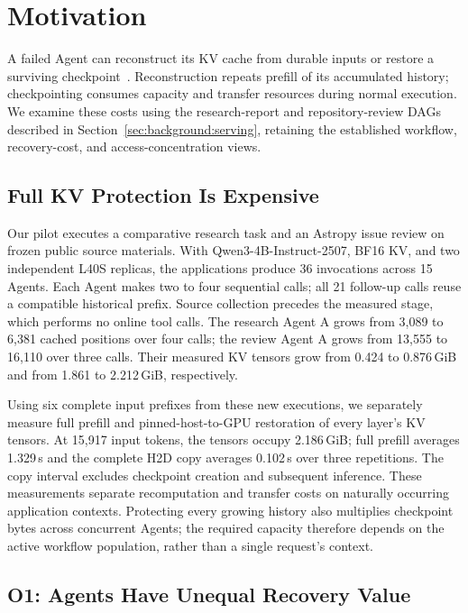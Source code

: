 \section{Motivation}\label{sec:motivation}

A failed Agent can reconstruct its KV cache from durable inputs or restore a surviving checkpoint~\cite{strati2024dejavu,cao2026lumen}. Reconstruction repeats prefill of its accumulated history; checkpointing consumes capacity and transfer resources during normal execution. We examine these costs using the research-report and repository-review DAGs described in Section~\ref{sec:background:serving}, retaining the established workflow, recovery-cost, and access-concentration views.

\subsection{Full KV Protection Is Expensive}\label{sec:motivation:cost}

Our pilot executes a comparative research task and an Astropy issue review on frozen public source materials. With Qwen3-4B-Instruct-2507, BF16 KV, and two independent L40S replicas, the applications produce 36 invocations across 15 Agents. Each Agent makes two to four sequential calls; all 21 follow-up calls reuse a compatible historical prefix. Source collection precedes the measured stage, which performs no online tool calls. The research Agent A grows from 3,089 to 6,381 cached positions over four calls; the review Agent A grows from 13,555 to 16,110 over three calls. Their measured KV tensors grow from 0.424 to 0.876\,GiB and from 1.861 to 2.212\,GiB, respectively.

Using six complete input prefixes from these new executions, we separately measure full prefill and pinned-host-to-GPU restoration of every layer's KV tensors. At 15,917 input tokens, the tensors occupy 2.186\,GiB; full prefill averages 1.329\,s and the complete H2D copy averages 0.102\,s over three repetitions. The copy interval excludes checkpoint creation and subsequent inference. These measurements separate recomputation and transfer costs on naturally occurring application contexts. Protecting every growing history also multiplies checkpoint bytes across concurrent Agents; the required capacity therefore depends on the active workflow population, rather than a single request's context.

\subsection{O1: Agents Have Unequal Recovery Value}\label{sec:motivation:agent}

